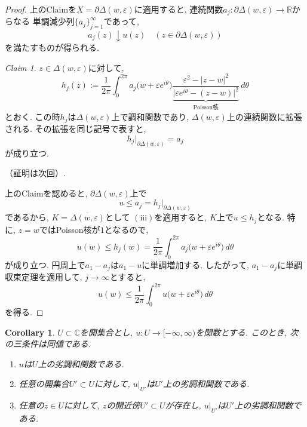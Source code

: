 \documentclass[dvipdfmx,a4paper,11pt]{report} %
\newtheorem{cor}[thm]{Corollary}
\theoremstyle{definition}
\theoremstyle{remark}
\newtheorem{claim}[thm]{Claim}
\numberwithin{equation}{section}
\newcommand{\R}{\mathbb{R}}
\newcommand{\C}{\mathbb{C}}
\begin{document}
\begin{proof}
上のClaimを$X=\partial\Delta(w,\varepsilon)$に適用すると,
連続関数$a_j \colon \partial\Delta(w,\varepsilon) \to \R$からなる
単調減少列$\{a_j\}_{j=1}^{\infty}$であって,
\[
a_j(z) \downarrow u(z)
\quad
(z \in \partial\Delta(w,\varepsilon))
\]
を満たすものが得られる.

\begin{tcolorbox}[mybox]
\begin{claim}
$z \in \Delta(w,\varepsilon)$に対して,
\[
h_j(z)
:=
\frac{1}{2\pi}
\int_0^{2\pi}
a_j\bigl(w+\varepsilon e^{i\theta}\bigr)
\underbrace{
\frac{\varepsilon^2-|z-w|^2}
{\bigl|\varepsilon e^{i\theta}-(z-w)\bigr|^2}
}_{\text{Poisson核}}
\,d\theta
\]
とおく.
この時$h_j$は$\Delta(w,\varepsilon)$上で調和関数であり,
$\overline{\Delta(w,\varepsilon)}$上の連続関数に拡張される.
その拡張を同じ記号で表すと,
\[
h_j|_{\partial\Delta(w,\varepsilon)}=a_j
\]
が成り立つ.
\end{claim}
\end{tcolorbox}
（証明は次回）.

上のClaimを認めると,
$\partial\Delta(w,\varepsilon)$上で
\[
u \leq a_j=h_j|_{\partial\Delta(w,\varepsilon)}
\]
であるから, $K=\overline{\Delta(w,\varepsilon)}$として
$\mathrm{(iii)}$を適用すると,
$K$上で$u \leq h_j$となる.
特に, $z=w$ではPoisson核が$1$となるので,
\[
u(w)
\leq h_j(w)
=
\frac{1}{2\pi}
\int_0^{2\pi}
a_j\bigl(w+\varepsilon e^{i\theta}\bigr)\,d\theta
\]
が成り立つ.
円周上で$a_1-a_j$は$a_1-u$に単調増加する.
したがって, $a_1-a_j$に単調収束定理を適用して,
$j \to \infty$とすると,
\[
u(w)
\leq
\frac{1}{2\pi}
\int_0^{2\pi}
u\bigl(w+\varepsilon e^{i\theta}\bigr)\,d\theta
\]
を得る.
\end{proof}

\begin{tcolorbox}[mybox]
\begin{cor}
$U \subset \C$を開集合とし,
$u \colon U \to [-\infty,\infty)$を関数とする.
このとき, 次の三条件は同値である.

\begin{enumerate}[label=(\roman*)]
\item
$u$は$U$上の劣調和関数である.

\item
任意の開集合$U' \subset U$に対して,
$u|_{U'}$は$U'$上の劣調和関数である.

\item
任意の$z \in U$に対して,
$z$の開近傍$U' \subset U$が存在し,
$u|_{U'}$は$U'$上の劣調和関数である.
\end{enumerate}
\end{cor}
\end{tcolorbox}
\end{document}
